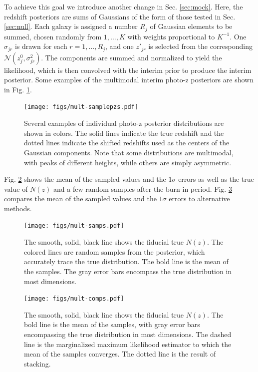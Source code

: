 \documentclass[preprint]{aastex}
\begin{document}
To achieve this goal we introduce another change in Sec. \ref{sec:mock}.  Here, 
the redshift posteriors are sums of Gaussians of the form of those tested in 
Sec. \ref{sec:null}.  Each galaxy is assigned a number $R_{j}$ of Gaussian 
elements to be summed, chosen randomly from $1,\dots,K$ with weights 
proportional to $K^{-1}$.  One $\sigma_{jr}$ is drawn for each 
$r=1,\dots,R_{j}$, and one $z'_{jr}$ is selected from the corresponding 
$\mathcal{N}(z^{0}_{j},\sigma^{2}_{jr})$.  The components are summed and 
normalized to yield the likelihood, which is then convolved with the interim 
prior to produce the interim posterior.  Some examples of the multimodal 
interim photo-z posteriors are shown in Fig. \ref{fig:multipzs}.  

\begin{figure}
\texttt{[image: figs/mult-samplepzs.pdf]}
\caption{Several examples of individual photo-z posterior distributions are 
shown in colors.  The solid lines indicate the true redshift and the dotted 
lines indicate the shifted redshifts used as the centers of the Gaussian 
components.  Note that some distributions are multimodal, with peaks of 
different heights, while others are simply asymmetric.}
\label{fig:multipzs}
\end{figure}

Fig. \ref{fig:multi-samp} shows the mean of the sampled values and the 
$1\sigma$ errors as well as the true value of $N(z)$ and a few random samples 
after the burn-in period.  Fig. \ref{fig:multi-comp} compares the mean of the 
sampled values and the $1\sigma$ errors to alternative methods.

\begin{figure}
\texttt{[image: figs/mult-samps.pdf]}
\caption{The smooth, solid, black line shows the fiducial true $N(z)$.  The 
colored lines are random samples from the posterior, which accurately trace the 
true distribution.  The bold line is the mean of the samples.  The gray error 
bars encompass the true distribution in most dimensions.}
\label{fig:multi-samp}
\end{figure}

\begin{figure}
\texttt{[image: figs/mult-comps.pdf]}
\caption{The smooth, solid, black line shows the fiducial true $N(z)$.  The 
bold line is the mean of the samples, with gray error bars encompassing the 
true distribution in most dimensions.  The dashed line is the marginalized 
maximum likelihood estimator to which the mean of the samples converges.  The 
dotted line is the result of stacking.}
\label{fig:multi-comp}
\end{figure}
\end{document}
